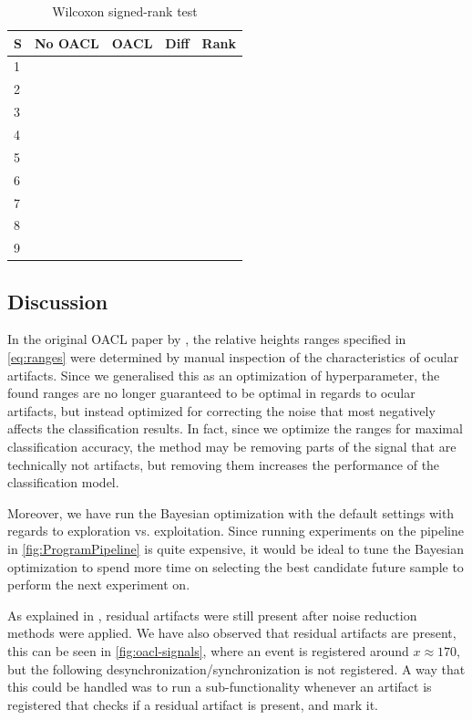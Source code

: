 \begin{table}[H]
	\centering
	\caption{Wilcoxon signed-rank test}
	\label{fig:wilcoxon}
	\begin{tabular}{@{}l|llll@{}}
		\toprule
		S & No OACL & OACL & Diff & Rank \\ \midrule
		1 &               &                 &      &      \\
		2 &               &                 &      &      \\
		3 &               &                 &      &      \\
		4 &               &                 &      &      \\
		5 &               &                 &      &      \\
		6 &               &                 &      &      \\
		7 &               &                 &      &      \\
		8 &               &                 &      &      \\
		9 &               &                 &      &      \\ \bottomrule
	\end{tabular}
\end{table}

\subsection{Discussion}\label{sec:discussion}
In the original OACL paper by \citep{li2015ocular}, the relative heights ranges specified in \cref{eq:ranges} were determined by manual inspection of the characteristics of ocular artifacts. Since we generalised this as an optimization of hyperparameter, the found ranges are no longer guaranteed to be optimal in regards to ocular artifacts, but instead optimized for correcting the noise that most negatively affects the classification results. In fact, since we optimize the ranges for maximal classification accuracy, the method may be removing parts of the signal that are technically not artifacts, but removing them increases the performance of the classification model.

Moreover, we have run the Bayesian optimization with the default settings with regards to exploration vs. exploitation. Since running experiments on the pipeline in \cref{fig:ProgramPipeline} is quite expensive, it would be ideal to tune the Bayesian optimization to spend more time on selecting the best candidate future sample to perform the next experiment on.

As explained in \cite{hoffmann2008correction}, residual artifacts were still present after noise reduction methods were applied. We have also observed that residual artifacts are present, this can be seen in \cref{fig:oacl-signals}, where an event is registered around $x \approx 170$, but the following desynchronization/synchronization is not registered. A way that this could be handled was to run a sub-functionality whenever an artifact is registered that checks if a residual artifact is present, and mark it. 
